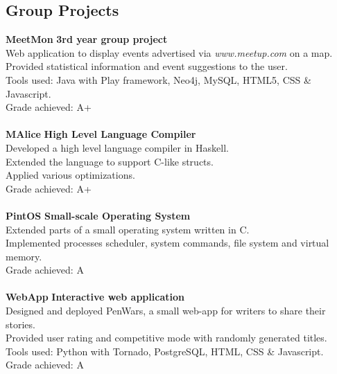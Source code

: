 \documentclass[a4paper,10pt]{article}
\begin{document}
\subsection*{Group Projects}
\begin{tabbing}
{\bf MeetMon} \hspace{24pt} \= {\bf 3rd year group project}\\
\>Web application to display events advertised via \textit{www.meetup.com} on a map.\\
\>Provided statistical information and event suggestions to the user.\\
\>Tools used: Java with Play framework, Neo4j, MySQL, HTML5, CSS \& Javascript.\\
\>Grade achieved: A+\\
\\
{\bf MAlice} \> {\bf High Level Language Compiler}\\
\> Developed a high level language compiler in Haskell.\\
\> Extended the language to support C-like structs.\\
\> Applied various optimizations.\\
\> Grade achieved: A+\\
\\
{\bf PintOS} \> {\bf Small-scale Operating System}\\
\>Extended parts of a small operating system written in C.\\
\>Implemented processes scheduler, system commands, file system and virtual memory.\\
\>Grade achieved: A\\
\\
{\bf WebApp} \> {\bf Interactive web application}\\
\> Designed and deployed PenWars, a small web-app for writers to share their stories.\\
\> Provided user rating and competitive mode with randomly generated titles.\\
\> Tools used: Python with Tornado, PostgreSQL, HTML, CSS \& Javascript.\\
\>Grade achieved: A\\
\end{tabbing}

\pagebreak
\ \\
\vspace{0.5cm}
\end{document}
